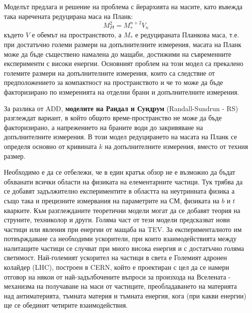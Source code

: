 Моделът предлага и решение на проблема с йерархията на масите, като въвежда така наречената редуцирана маса на Планк:
\begin{equation}
M_{Pl}^2 = M_*^{n+2}V_n
\end{equation}
където $V$ е обемът на пространството, а $M_*$ е редуцираната Планкова маса, т.е. при достатъчно големи размери на допълнителните измерения, масата на Планк може да бъде съществено намалена до мащаби, достижими на съвременните експерименти с високи енергии. Основният проблем на този модел са прекалено големите размери на допълнителните измерения, които са следствие от предположението за компактност на пространството и че то може да бъде факторизирано по измеренията на отделни брани и допълнителните измерения.
\par За разлика от ADD, {\bf моделите на Рандал и Сундрум} (Randall-Sundrun - RS) \cite{RSExrta1, RSExrta2} разглеждат вариант, в който общото време-пространство не може да бъде факторизирано, а напрежението на браните води до закривяване на допълнителните измерения. В този модел редуцирането на масата на Планк се определя основно от кривината $k$ на допълнителните измерения, вместо от техния размер.


\par Необходимо е да се отбележи, че в един кратък обзор не е възможно да бъдат обхванати всички области на физиката на елементарните частици. Тук трябва да се добавят задължително експериментите в областта на неутринната физика а също така и прецизните измервания на параметрите на СМ, физиката на $b$ и $t$ кварките. Към разглежданите теоретични модели могат да се добавят теория на струните, техниколор и други. Голяма част от тези модели предсказват нови частици или явления при енергии от мащаба на TEV. За експерименталното им потвърждаване са необходими ускорители, при които взаимодействията между налитащите частици се случват при много висока енергия и с достатъчно голяма светимост. Най-големият ускорител на частици в света е Големият адронен колайдер (LHC), построен в CERN, който е проектиран с цел да се намери отговор на някои от най-задълбочените въпроси за произхода на Вселената - механизма на получаване на маси от частиците, преобладаването на материята над антиматерията, тъмната материя и тъмната енергия,  кога (при какви енергии) ще се обединят четирите взаимодействия.

